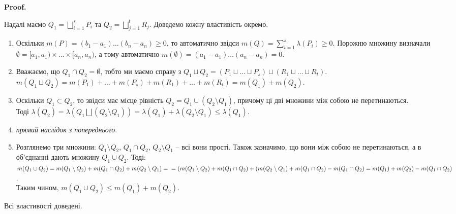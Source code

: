 \documentclass[a4paper, 10pt]{article}
\makeatletter
\def\huge{\displaystyle}
\def\qed{$\blacksquare$}
\theoremstyle{theoremdd}
\theoremstyle{theoremdd}
\theoremstyle{theoremdd}
\theoremstyle{theoremdd}
\theoremstyle{theoremdd}
\theoremstyle{theoremdd}
\theoremstyle{theoremdd}
\theoremstyle{theoremdd}
\theoremstyle{theoremdd}
\theoremstyle{theoremdd}
\theoremstyle{theoremdd}
\theoremstyle{theoremdd}
\theoremstyle{theoremdd}
\theoremstyle{theoremdd}
\theoremstyle{theoremdd}
\renewenvironment{proof}[1][Proof.\\]{\par
\pushQED{\hfill \qed}%
\normalfont \topsep6\p@\@plus6\p@\relax
\trivlist
\item\relax
{\bfseries
#1\@addpunct{.}}\hspace\labelsep\ignorespaces
}{%
\popQED\endtrivlist\@endpefalse
}
\makeatother
\begin{document}
\begin{proof}
Надалі маємо $Q_1 = \huge\bigsqcup_{i=1}^s P_i$ та $Q_2 = \huge\bigsqcup_{j=1}^t R_j$. Доведемо кожну властивість окремо.
\begin{enumerate}[wide=0pt,label={\arabic*)}]
\item Оскільки $m(P) = (b_1-a_1)\dots (b_n-a_n) \geq 0$, то автоматично звідси $m(Q) = \huge\sum_{i=1}^s \lambda(P_i) \geq 0$. Порожню множину визначали $\emptyset = [a_1,a_1) \times \dots \times [a_n,a_n)$, а тому автоматично $m(\emptyset) = (a_1-a_1) \dots (a_n-a_n) = 0$.
\item Вважаємо, що $Q_1 \cap Q_2 = \emptyset$, тобто ми маємо справу з $Q_1 \sqcup Q_2 = (P_1 \sqcup \dots \sqcup P_s) \sqcup (R_1 \sqcup \dots \sqcup R_t)$.\\
$m(Q_1 \sqcup Q_2) = m(P_1) + \dots + m(P_s) + m(R_1) + \dots + m(R_t) = m(Q_1) + m(Q_2)$.
\item Оскільки $Q_1 \subset Q_2$, то звідси має місце рівність $Q_2 = Q_1 \cup (Q_2 \setminus Q_1)$, причому ці дві множини між собою не перетинаються.\\
Тоді $\lambda(Q_2) = \lambda(Q_1 \bigsqcup (Q_2 \setminus Q_1)) = \lambda(Q_1) + \lambda(Q_2 \setminus Q_1) \leq \lambda(Q_1)$.
\item \textit{прямий наслідок з попереднього}.
\item Розглянемо три множини: $Q_1 \setminus Q_2$, $Q_1 \cap Q_2$, $Q_2 \setminus Q_1$ -- всі вони прості. Також зазначимо, що вони між собою не перетинаються, а в об'єднанні дають множину $Q_1 \cup Q_2$. Тоді:\\
$m(Q_1 \cup Q_2) = m(Q_1 \setminus Q_2) + m(Q_1 \cap Q_2) + m(Q_2 \setminus Q_1) = \\ = (m(Q_1 \setminus Q_2) + m(Q_1\cap Q_2) + (m(Q_2 \setminus Q_1) + m(Q_1 \cap Q_2) - m(Q_1 \cap Q_2) = m(Q_1) + m(Q_2) - m(Q_1 \cap Q_2)$.\\
Таким чином, $m(Q_1 \cup Q_2) \leq m(Q_1) + m(Q_2)$.
\end{enumerate}
Всі властивості доведені.
\end{proof}
\end{document}
